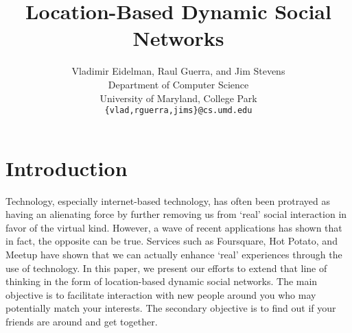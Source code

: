 \documentclass[11pt]{article}
\title{Location-Based Dynamic Social Networks}
\author{
   Vladimir Eidelman, Raul Guerra, and Jim Stevens\\
Department of Computer Science \\
University of Maryland, College Park\\
 { \tt \{vlad,rguerra,jims\}@cs.umd.edu}
}
\begin{document}
\maketitle 

\section{Introduction}



Technology, especially internet-based technology, has often been protrayed as having an alienating force by further removing us from `real' social interaction in favor of the virtual kind. However, a wave of recent applications has shown that in fact, the opposite can be true. Services such as Foursquare, Hot Potato, and Meetup have shown that we can actually enhance `real' experiences through the use of technology. In this paper, we present our efforts to extend that line of thinking in the form of location-based dynamic social networks. The main objective is to facilitate interaction with new people around you who may potentially match your interests. The secondary objective is to find out if your friends are around and get together. 
\end{document}
